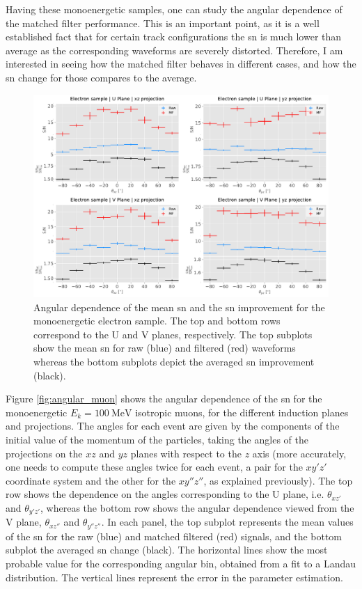 Having these monoenergetic samples, one can study the angular dependence of the matched filter performance. This is an important point, as it is a well established fact that for certain track configurations the \gls{sn} is much lower than average as the corresponding waveforms are severely distorted. Therefore, I am interested in seeing how the matched filter behaves in different cases, and how the \gls{sn} change for those compares to the average.

\begin{figure}[t]
	\centering
	\includegraphics[width=0.9\linewidth]{Images/Matched_Filter/larsoft_electron_angular_alt.pdf}
	\caption[Angular dependence of the mean \gls{sn} and the \gls{sn} improvement for the monoenergetic electron sample.]{Angular dependence of the mean \gls{sn} and the \gls{sn} improvement for the monoenergetic electron sample. The top and bottom rows correspond to the U and V planes, respectively. The top subplots show the mean \gls{sn} for raw (blue) and filtered (red) waveforms whereas the bottom subplots depict the averaged \gls{sn} improvement (black).}
	\label{fig:angular_electron}
\end{figure}

Figure \ref{fig:angular_muon} shows the angular dependence of the \gls{sn} for the monoenergetic $E_{k}=100 \ \mathrm{MeV}$ isotropic muons, for the different induction planes and projections. The angles for each event are given by the components of the initial value of the momentum of the particles, taking the angles of the projections on the $xz$ and $yz$ planes with respect to the $z$ axis (more accurately, one needs to compute these angles twice for each event, a pair for the $xy'z'$ coordinate system and the other for the $xy''z''$, as explained previously). The top row shows the dependence on the angles corresponding to the U plane, i.e. $\theta_{xz'}$ and $\theta_{y'z'}$, whereas the bottom row shows the angular dependence viewed from the V plane, $\theta_{xz''}$ and $\theta_{y''z''}$. In each panel, the top subplot represents the mean values of the \gls{sn} for the raw (blue) and matched filtered (red) signals, and the bottom subplot the averaged \gls{sn} change (black). The horizontal lines show the most probable value for the corresponding angular bin, obtained from a fit to a Landau distribution. The vertical lines represent the error in the parameter estimation.

